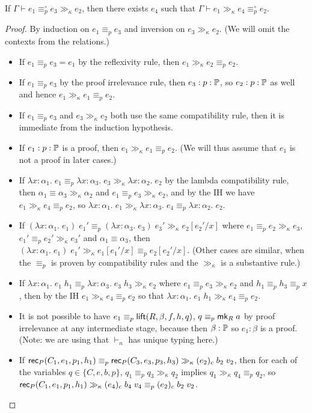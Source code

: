 \begin{lemma}\label{gg_compat}
If $\Gamma\vdash e_1\equiv_p^\circ e_3\gg_\kappa e_2$, then there exists $e_4$ such that $\Gamma\vdash e_1\gg_\kappa e_4\equiv_p^\circ e_2$.
\end{lemma}
\begin{proof}
By induction on $e_1\equiv_p e_3$ and inversion on $e_3\gg_\kappa e_2$. (We will omit the contexts from the relations.)
\begin{itemize}
\item If $e_1\equiv_p e_3=e_1$ by the reflexivity rule, then $e_1\gg_\kappa e_2\equiv_p e_2$.
\item If $e_1\equiv_p e_3$ by the proof irrelevance rule, then $e_3:p:\P$, so $e_2:p:\P$ as well and hence $e_1\gg_\kappa e_1\equiv_p e_2$.
\item If $e_1\equiv_p e_3$ and $e_3\gg_\kappa e_2$ both use the same compatibility rule, then it is immediate from the induction hypothesis.
\item If $e_1:p:\P$ is a proof, then $e_1\gg_\kappa e_1\equiv_p e_2$. (We will thus assume that $e_1$ is not a proof in later cases.)
\item If $\lambda x:\alpha_1.\;e_1\equiv_p\lambda x:\alpha_3.\;e_3\gg_\kappa\lambda x:\alpha_2.\;e_2$ by the lambda compatibility rule, then $\alpha_1\equiv\alpha_3\gg_\kappa\alpha_2$ and $e_1\equiv_p e_3\gg_\kappa e_2$, and by the IH we have $e_1\gg_\kappa e_4\equiv_p e_2$, so $\lambda x:\alpha_1.\;e_1\gg_\kappa\lambda x:\alpha_3.\;e_4\equiv_p\lambda x:\alpha_2.\;e_2$.
\item If $(\lambda x:\alpha_1.\;e_1)\;e_1'\equiv_p(\lambda x:\alpha_3.\;e_3)\;e_3'\gg_\kappa e_2[e_2'/x]$ where $e_1\equiv_p e_2\gg_\kappa e_3$, $e_1'\equiv_p e_2'\gg_\kappa e_3'$ and $\alpha_1\equiv\alpha_3$, then $(\lambda x:\alpha_1.\;e_1)\;e_1'\gg_\kappa e_1[e_1'/x]\equiv_p e_2[e_2'/x]$. (Other cases are similar, when the $\equiv_p$ is proven by compatibility rules and the $\gg_\kappa$ is a substantive rule.)
\item If $\lambda x:\alpha_1.\;e_1\;h_1\equiv_p\lambda x:\alpha_3.\;e_3\;h_3\gg_\kappa e_2$ where $e_1\equiv_p e_3\gg_\kappa e_2$ and $h_1\equiv_p h_3\equiv_p x$, then by the IH $e_1\gg_\kappa e_4\equiv_p e_2$ so that $\lambda x:\alpha_1.\;e_1\;h_1\gg_\kappa e_4\equiv_p e_2$.
\item It is not possible to have $e_1\equiv_p\lift(R,\beta,f,h,q)$, $q\equiv_p \mk_R\;a$ by proof irrelevance at any intermediate stage, because then $\beta:\P$ so $e_1:\beta$ is a proof. (Note: we are using that $\vdash_n$ has unique typing here.)
\item If $\rec_P(C_1,e_1,p_1,h_1)\equiv_p \rec_P(C_3,e_3,p_3,h_3)\gg_\kappa (e_2)_c\;b_2\;v_2$, then for each of the variables $q\in\{C,e,b,p\}$, $q_1\equiv_p q_3\gg_\kappa q_2$ implies $q_1\gg_\kappa q_4\equiv_p q_2$, so $\rec_P(C_1,e_1,p_1,h_1)\gg_\kappa (e_4)_c\;b_4\;v_4\equiv_p (e_2)_c\;b_2\;v_2$.
\end{itemize}
\end{proof}
